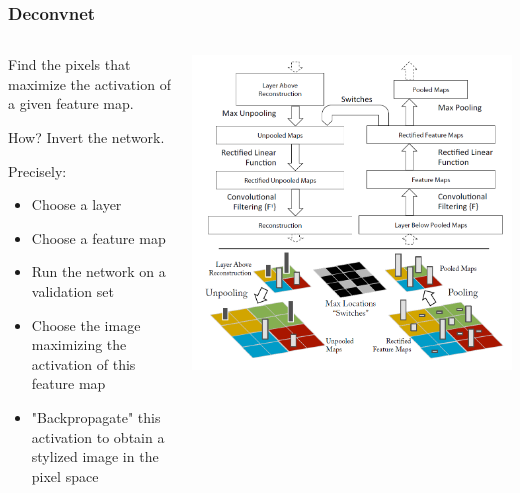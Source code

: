 \begin{frame}
	\frametitle{Deconvnet}


	\begin{columns} %
		\begin{column}{.4\textwidth}
		Find the pixels that maximize the activation of a given feature map.

		\bigskip

		How? Invert the network.

		\bigskip

		Precisely:
		\begin{itemize}
			\item Choose a layer
			\item Choose a feature map
			\item Run the network on a validation set
			\item Choose the image maximizing the activation of this feature map
			\item "Backpropagate" this activation to obtain a stylized image in the pixel space
		\end{itemize}
		\end{column}%

		\begin{column}{.6\textwidth}
			\hspace{-1.5cm}
			\begin{center}
				\includegraphics[scale=0.6]{figs/deconvnet}
			\end{center}
		\end{column}%
	\end{columns}






\end{frame}

